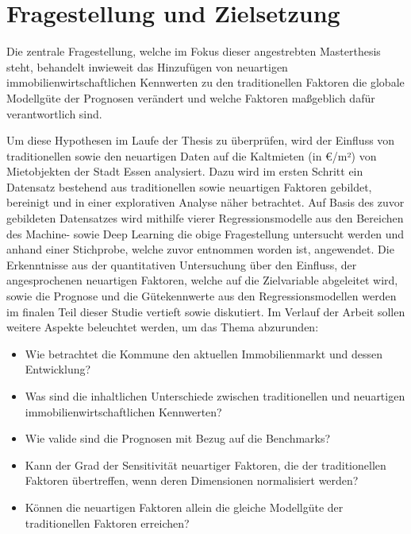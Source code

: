 \section{Fragestellung und Zielsetzung}
Die zentrale Fragestellung, welche im Fokus dieser angestrebten 
Masterthesis steht, behandelt inwieweit das Hinzufügen von neuartigen 
immobilienwirtschaftlichen Kennwerten zu den traditionellen Faktoren 
die globale Modellgüte der Prognosen verändert und welche Faktoren 
maßgeblich dafür verantwortlich sind.

Um diese Hypothesen im Laufe der Thesis zu überprüfen, wird der 
Einfluss von traditionellen sowie den neuartigen Daten auf die 
Kaltmieten (in €/m²) von Mietobjekten der Stadt Essen analysiert. 
Dazu wird im ersten Schritt ein Datensatz bestehend aus traditionellen 
sowie neuartigen Faktoren gebildet, bereinigt und in einer explorativen 
Analyse näher betrachtet. Auf Basis des zuvor gebildeten Datensatzes 
wird mithilfe vierer Regressionsmodelle aus den Bereichen des Machine- 
sowie Deep Learning die obige Fragestellung untersucht werden und 
anhand einer Stichprobe, welche zuvor entnommen worden ist, angewendet. 
Die Erkenntnisse aus der quantitativen Untersuchung über den Einfluss, 
der angesprochenen neuartigen Faktoren, welche auf die Zielvariable 
abgeleitet wird, sowie die Prognose und die Gütekennwerte aus den 
Regressionsmodellen werden im finalen Teil dieser Studie vertieft 
sowie diskutiert.
\newpage
Im Verlauf der Arbeit sollen weitere Aspekte beleuchtet werden, um das 
Thema abzurunden:

\begin{itemize}
    \item Wie betrachtet die Kommune den aktuellen Immobilienmarkt und dessen Entwicklung?
    \item Was sind die inhaltlichen Unterschiede zwischen traditionellen und neuartigen immobilienwirtschaftlichen Kennwerten?
    \item Wie valide sind die Prognosen mit Bezug auf die Benchmarks?
    \item Kann der Grad der Sensitivität neuartiger Faktoren, die der traditionellen Faktoren übertreffen, wenn deren Dimensionen normalisiert werden?
    \item Können die neuartigen Faktoren allein die gleiche Modellgüte der traditionellen Faktoren erreichen?
\end{itemize}